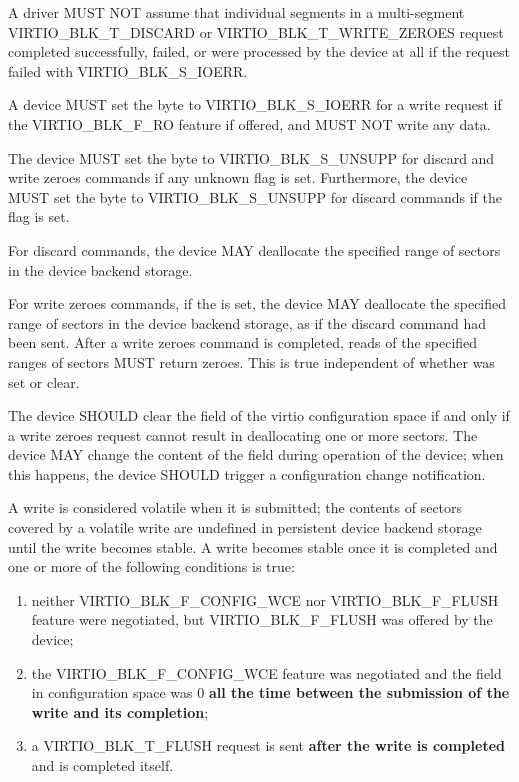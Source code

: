 A driver MUST NOT assume that individual segments in a multi-segment
VIRTIO_BLK_T_DISCARD or VIRTIO_BLK_T_WRITE_ZEROES request completed
successfully, failed, or were processed by the device at all if the request
failed with VIRTIO_BLK_S_IOERR.


A device MUST set the  byte to VIRTIO_BLK_S_IOERR
for a write request if the VIRTIO_BLK_F_RO feature if offered, and MUST NOT
write any data.

The device MUST set the  byte to VIRTIO_BLK_S_UNSUPP for
discard and write zeroes commands if any unknown flag is set.
Furthermore, the device MUST set the  byte to
VIRTIO_BLK_S_UNSUPP for discard commands if the  flag is set.

For discard commands, the device MAY deallocate the specified range of
sectors in the device backend storage.

For write zeroes commands, if the  is set, the device MAY
deallocate the specified range of sectors in the device backend storage,
as if the discard command had been sent.  After a write zeroes command
is completed, reads of the specified ranges of sectors MUST return
zeroes.  This is true independent of whether  was set or clear.

The device SHOULD clear the  field of the
virtio configuration space if and only if a write zeroes request cannot
result in deallocating one or more sectors.  The device MAY change the
content of the field during operation of the device; when this happens,
the device SHOULD trigger a configuration change notification.

A write is considered volatile when it is submitted; the contents of
sectors covered by a volatile write are undefined in persistent device
backend storage until the write becomes stable.  A write becomes stable
once it is completed and one or more of the following conditions is true:

\begin{enumerate}
\item\label{item:flush1} neither VIRTIO_BLK_F_CONFIG_WCE nor
  VIRTIO_BLK_F_FLUSH feature were negotiated, but VIRTIO_BLK_F_FLUSH was
  offered by the device;

\item\label{item:flush2} the VIRTIO_BLK_F_CONFIG_WCE feature was negotiated and the
   field in configuration space was 0 \textbf{all the time between
  the submission of the write and its completion};

\item\label{item:flush3} a VIRTIO_BLK_T_FLUSH request is sent \textbf{after the write is
  completed} and is completed itself.
\end{enumerate}

